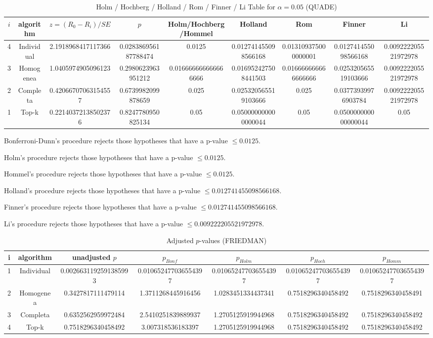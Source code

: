 \documentclass[a4paper,10pt]{article}
\begin{document}
\begin{landscape}
\begin{table}[!htp]
\centering\scriptsize
\caption{Holm / Hochberg / Holland / Rom / Finner / Li Table for $\alpha=0.05$ (QUADE)}
\begin{tabular}{ccccccccc}
$i$&algorithm&$z=(R_0 - R_i)/SE$&$p$&Holm/Hochberg/Hommel&Holland&Rom&Finner&Li\\
\hline
4&Individual&2.1918968417117366&0.028386956187788474&0.0125&0.012741455098566168&0.013109375000000001&0.012741455098566168&0.009222205521972978\\
3&Homogenea&1.0405974905096123&0.2980623963951212&0.016666666666666666&0.016952427508441503&0.016666666666666666&0.025320565519103666&0.009222205521972978\\
2&Completa&0.42066707063154557&0.6739982099878659&0.025&0.025320565519103666&0.025&0.03773939976903784&0.009222205521972978\\
1&Top-k&0.22140372138502376&0.8247780950825134&0.05&0.050000000000000044&0.05&0.050000000000000044&0.05\\
\hline
\end{tabular}
\end{table}
Bonferroni-Dunn's procedure rejects those hypotheses that have a p-value $\le0.0125$.


Holm's procedure rejects those hypotheses that have a p-value $\le0.0125$.


Hommel's procedure rejects those hypotheses that have a p-value $\le0.0125$.


Holland's procedure rejects those hypotheses that have a p-value $\le0.012741455098566168$.


Finner's procedure rejects those hypotheses that have a p-value $\le0.012741455098566168$.


Li's procedure rejects those hypotheses that have a p-value $\le0.009222205521972978$.



\newpage

\begin{table}[!htp]
\centering\scriptsize
\caption{Adjusted $p$-values (FRIEDMAN)}
\begin{tabular}{ccccccc}
i&algorithm&unadjusted $p$&$p_{Bonf}$&$p_{Holm}$&$p_{Hoch}$&$p_{Homm}$\\
\hline
1&Individual&0.0026631192591385993&0.010652477036554397&0.010652477036554397&0.010652477036554397&0.010652477036554397\\
2&Homogenea&0.3427817111479114&1.3711268445916456&1.0283451334437341&0.7518296340458492&0.7518296340458491\\
3&Completa&0.6352562959972484&2.5410251839889937&1.2705125919944968&0.7518296340458492&0.7518296340458492\\
4&Top-k&0.7518296340458492&3.007318536183397&1.2705125919944968&0.7518296340458492&0.7518296340458492\\
\hline
\end{tabular}
\end{table}


\end{landscape}
\end{document}
